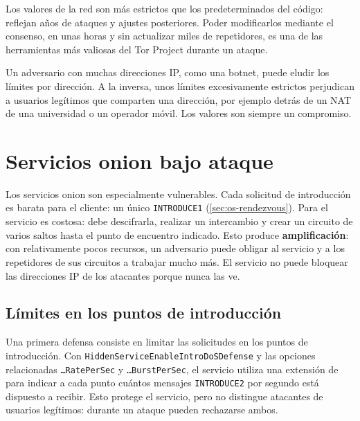 Los valores de la red son más estrictos que los predeterminados del código: reflejan años de ataques y ajustes posteriores. Poder modificarlos mediante el consenso, en unas horas y sin actualizar miles de repetidores, es una de las herramientas más valiosas del Tor Project durante un ataque.

\begin{attenzione}
Un adversario con muchas direcciones IP, como una botnet, puede eludir los límites por dirección. A la inversa, unos límites excesivamente estrictos perjudican a usuarios legítimos que comparten una dirección, por ejemplo detrás de un NAT de una universidad o un operador móvil. Los valores son siempre un compromiso.
\end{attenzione}

\section{Servicios onion bajo ataque}\label{sec:dos-onion}

Los servicios onion son especialmente vulnerables. Cada solicitud de introducción es barata para el cliente: un único \texttt{INTRODUCE1} (\cref{sec:os-rendezvous}). Para el servicio es costosa: debe descifrarla, realizar un intercambio y crear un circuito de varios saltos hasta el punto de encuentro indicado. Esto produce \textbf{amplificación}: con relativamente pocos recursos, un adversario puede obligar al servicio y a los repetidores de sus circuitos a trabajar mucho más. El servicio no puede bloquear las direcciones IP de los atacantes porque nunca las ve.

\subsection{Límites en los puntos de introducción}

Una primera defensa consiste en limitar las solicitudes en los puntos de introducción. Con \texttt{HiddenService\-EnableIntroDoS\-Defense} y las opciones relacionadas \texttt{\ldots RatePerSec} y \texttt{\ldots BurstPerSec}, el servicio utiliza una extensión  de  para indicar a cada punto cuántos mensajes \texttt{INTRODUCE2} por segundo está dispuesto a recibir. Esto protege el servicio, pero no distingue atacantes de usuarios legítimos: durante un ataque pueden rechazarse ambos.

